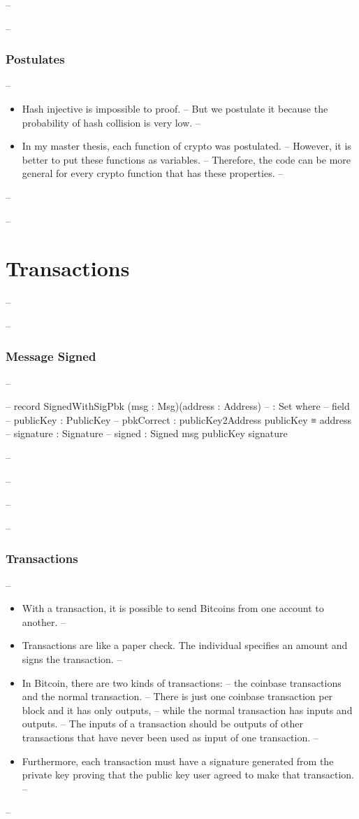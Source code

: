\documentclass{beamer}
\begin{document}
-- \begin{frame}
--   \frametitle{Postulates}
--   \begin{itemize}[<+->]
--     \item Hash injective is impossible to proof.
--       But we postulate it because the probability of hash collision is very low.
--     \item In my master thesis, each function of crypto was postulated.
--       However, it is better to put these functions as variables.
--       Therefore, the code can be more general for every crypto function that has these properties.
--   \end{itemize}
-- \end{frame}

-- \section{Transactions}

-- \begin{frame}
--   \frametitle{Message Signed}
-- \begin{code}
--     record SignedWithSigPbk (msg : Msg)(address : Address)
--       : Set where
--       field
--         publicKey   :  PublicKey
--         pbkCorrect  :  publicKey2Address publicKey ≡ address
--         signature   :  Signature
--         signed      :  Signed msg publicKey signature

-- \end{code}
-- \end{frame}

-- \begin{frame}
--    \frametitle{Transactions}
--    \begin{itemize}[<+->]
--      \item With a transaction, it is possible to send Bitcoins from one account to another.
--      \item Transactions are like a paper check. The individual specifies an amount and signs the transaction.
--      \item In Bitcoin, there are two kinds of transactions:
--        the coinbase transactions and the normal transaction.
--        There is just one coinbase transaction per block and it has only outputs,
--        while the normal transaction has inputs and outputs.
--        The inputs of a transaction should be outputs of other transactions that have never been used as input of one transaction.
--     \item Furthermore, each transaction must have a signature generated from the private key proving that the public key user agreed to make that transaction.
--    \end{itemize}
-- \end{frame}
\end{document}
